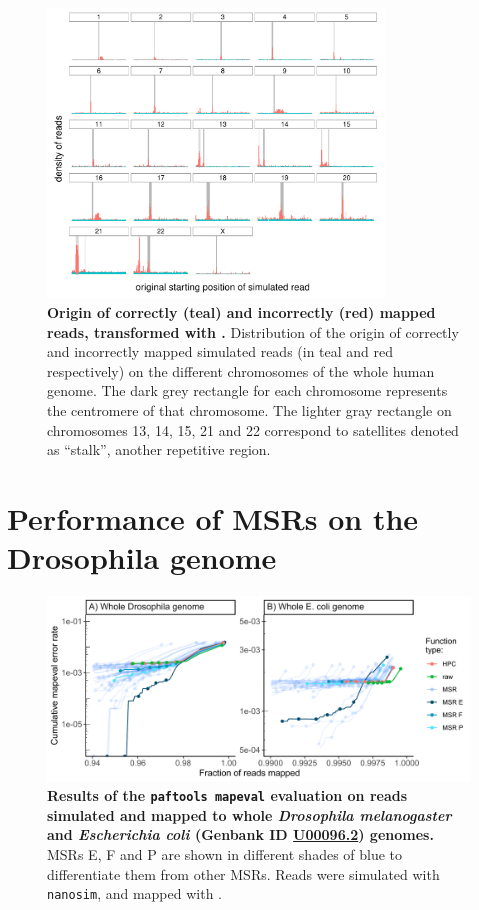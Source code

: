 \documentclass[
  11pt,
  twoside,
  BCOR=10mm,
  listof=totoc]{scrbook}
\newcommand{\extcaption}[2]{
    \caption[#1]{
        \textbf{#1}\newline
        #2
    }
}
\begin{document}
\begin{figure}[H]
    \centering
    \includegraphics[width=0.8\textwidth]{figures/HPC-MSRs/msr_f2_distrib.centro.pdf}
    \extcaption{Origin of correctly (teal) and incorrectly (red) mapped reads, transformed with \msr{F}.}{Distribution of the origin of correctly and incorrectly mapped simulated reads (in teal and red respectively) on the different chromosomes of the whole human genome. The dark grey rectangle for each chromosome represents the centromere of that chromosome. The lighter gray rectangle on chromosomes 13, 14, 15, 21 and 22 correspond to satellites denoted as ``stalk'', another repetitive region.}
    \label{fig:hist-msr-f}
\end{figure}

\hypertarget{performance-of-msrs-on-the-drosophila-genome}{%
\section{Performance of MSRs on the Drosophila genome}\label{performance-of-msrs-on-the-drosophila-genome}}

\begin{figure}[H]
    \centering
    \includegraphics[width=\textwidth]{figures/HPC-MSRs/droso_ecoli.pdf}
    \extcaption{Results of the \texttt{paftools mapeval} evaluation on reads simulated and mapped to whole \textit{Drosophila melanogaster} and \textit{Escherichia coli} (Genbank ID \href{https://www.ncbi.nlm.nih.gov/nuccore/U00096.2}{U00096.2}) genomes.}{MSRs E, F and P are shown in different shades of blue to differentiate them from other MSRs. Reads were simulated with \texttt{nanosim}, and mapped with \minimap.}
    \label{fig:drosophila-results}
\end{figure}
\newpage
\end{document}
